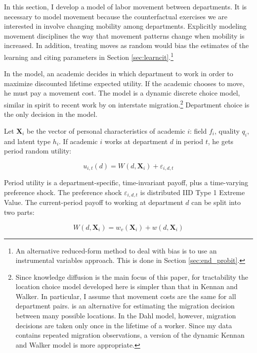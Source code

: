 In this section, I develop a model of labor movement between departments.  It is necessary to model movement because the counterfactual exercises we are interested in involve changing mobility among departments.  Explicitly modeling movement disciplines the way that movement patterns change when mobility is increased.  In addition, treating moves as random would bias the estimates of the learning and citing parameters in Section \ref{sec:learncit}.\footnote{An alternative reduced-form method to deal with bias is to use an instrumental variables approach.  This is done in Section \ref{sec:end_probit}.}

In the model, an academic decides in which department to work in order to
maximize discounted lifetime expected utility. If the academic chooses to move, he must pay a movement cost.  The model is a dynamic discrete choice model, similar in spirit to recent work by \citet{kennan2011effect} on interstate migration.\footnote{Since knowledge diffusion is the main focus of this paper, for tractability the location choice model developed here is simpler than that in Kennan and Walker.  In particular, I assume that movement costs are the same for all department pairs.  \citet{dahl2002mobility} is an alternative for estimating the migration decision between many possible locations.  In the Dahl model, however, migration decisions are taken only once in the lifetime of a worker.  Since my data contains repeated migration observations,  a version of the dynamic Kennan and Walker model is more appropriate.} Department choice is the only decision in the model.

Let $\mathbf{X}_i$ be the vector of personal characteristics of academic $i$: field $f_i$, quality
$q_i$, and latent type $h_i$. If academic $i$ works at department
$d$ in period $t$, he gets period random utility:

\begin{equation}
    u_{i,t}(d) = W(d, \mathbf{X}_i) + \varepsilon_{i,d,t}
    \label{eq:util}
\end{equation}

Period utility is a department-specific, time-invariant payoff, plus a time-varying preference shock.  The preference shock
 $\varepsilon_{i,d,t}$ is distributed IID Type 1 Extreme Value.
The current-period payoff to working at department $d$ can be split into two parts:

\begin{equation}
    W(d, \mathbf{X}_i) = w_v(\mathbf{X}_i) + w(d, \mathbf{X}_i)
\end{equation}

